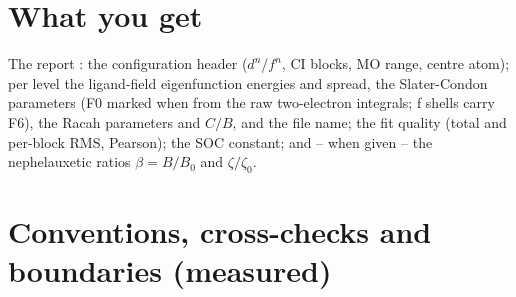 \section{What you get}

The report : the configuration header
($d^n$/$f^n$, CI blocks, MO range, centre atom); per level the
ligand-field eigenfunction energies and spread, the Slater-Condon
parameters (F0 marked  when from the raw two-electron
integrals; f shells carry F6), the Racah parameters and $C/B$, and the
 file name; the fit quality (total and per-block RMS,
Pearson); the SOC constant; and -- when given -- the nephelauxetic ratios
$\beta = B/B_0$ and $\zeta/\zeta_0$.

\section{Conventions, cross-checks and boundaries (measured)}

